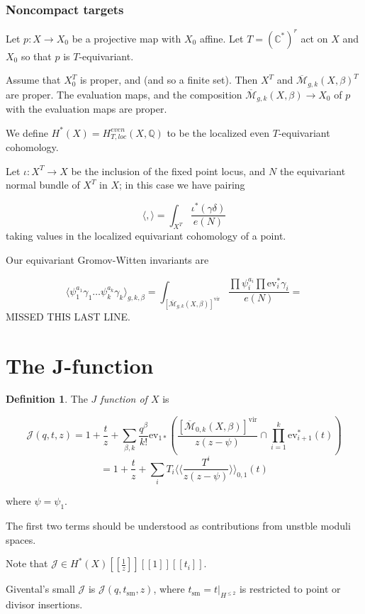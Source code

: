 \documentclass{amsart}
\theoremstyle{definition}
\newtheorem{definition}[dummy]{Definition}
\newcommand{\J}{\mathcal{J}}
\newcommand{\sm}{\text{sm}}
\newcommand{\Mbar}{\overline{\mathcal{M}}}
\newcommand{\Q}{\mathbb{Q}}
\newcommand{\C}{\mathbb{C}}
\newcommand{\one}{1}
\newcommand{\ev}{\text{ev}}
\newcommand{\vir}{\text{vir}}
\begin{document}
\subsubsection{Noncompact targets}
Let $p:X\to X_0$ be a projective map with $X_0$ affine.  Let $T=(\C^*)^r$ act on $X$ and $X_0$ so that $p$ is $T$-equivariant.

Assume that $X_0^T$ is proper, and (and so a finite set).  Then $X^T$ and $\Mbar_{g,k}(X,\beta)^T$ are proper.  The evaluation maps, and the composition $\Mbar_{g,k}(X,\beta)\to X_0$ of $p$ with the evaluation maps are proper.

We define $H^*(X)=H^{even}_{T, loc}(X,\Q)$ to be the localized even $T$-equivariant cohomology.

Let $\iota:X^T\to X$ be the inclusion of the fixed point locus, and $N$ the equivariant normal bundle of $X^T$ in $X$; in this case we have pairing

$$\langle, \rangle=\int_{X^T}\frac{\iota^*(\gamma\delta)}{e(N)}$$
taking values in the localized equivariant cohomology of a point.

Our equivariant Gromov-Witten invariants are

$$\langle \psi_1^{a_1}\gamma_1\dots \psi_k^{a_k}\gamma_k\rangle_{g,k,\beta}
=\int_{[\Mbar_{g,k}(X,\beta)]^{\vir}} \frac{\prod \psi_i^{a_i} \prod \ev_i^* \gamma_i}{e(N)}=$$
MISSED THIS LAST LINE.


\section{The J-function}

\begin{definition}
The \emph{$J$ function of $X$} is

$$\J(q,t,z)=\one+\frac{t}{z}+\sum_{\beta,k}\frac{q^\beta}{k!}\ev_{1*}\left(\frac{[\Mbar_{0,k}(X,\beta)]^\vir}{z(z-\psi)}\cap \prod_{i=1}^k \ev^*_{i+1}(t)\right)$$
$$=\one +\frac{t}{z}+\sum_i T_i\langle\langle \frac{T^i}{z(z-\psi)}\rangle\rangle_{0,1}(t)$$

where $\psi=\psi_1$.
\end{definition}


The first two terms should be understood as contributions from unstble moduli spaces.

Note that $\J\in H^*(X)[[\frac{1}{z}]][[1]][[t_i]]$.

Givental's small $\J$ is $\J(q,t_\sm,z)$, where $t_\sm=t|_{H^{\leq 2}}$ is restricted to point or divisor insertions.
\end{document}
